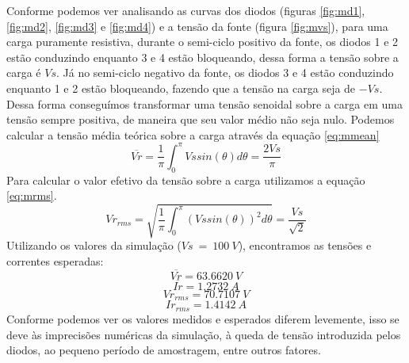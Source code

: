 \documentclass{report}
\begin{document}
Conforme podemos ver analisando as curvas dos diodos (figuras \ref{fig:md1}, \ref{fig:md2}, \ref{fig:md3} e \ref{fig:md4}) e a tensão da fonte (figura \ref{fig:mvs}), para uma carga puramente resistiva, durante o semi-ciclo positivo da fonte, os diodos 1 e 2 estão conduzindo enquanto 3 e 4 estão bloqueando, dessa forma a tensão sobre a carga é $Vs$. Já no semi-ciclo negativo da fonte, os diodos 3 e 4 estão conduzindo enquanto 1 e 2 estão bloqueando, fazendo que a tensão na carga seja de $-Vs$. Dessa forma conseguímos transformar uma tensão senoidal sobre a carga em uma tensão sempre positiva, de maneira que seu valor médio não seja nulo.
Podemos calcular a tensão média teórica sobre a carga através da equação \ref{eq:mmean}
\begin{equation}
	\overline{Vr} = \frac{1}{\pi} \int_{0}^{\pi}{Vs sin(\theta)d\theta} = \frac{2 Vs}{\pi}
	\label{eq:mmean}
\end{equation}
Para calcular o valor efetivo da tensão sobre a carga utilizamos a equação \ref{eq:mrms}.
\begin{equation}
	Vr_{rms} = \sqrt{\frac{1}{\pi} \int_{0}^{\pi}{(Vs sin(\theta))^2 d\theta}} = \frac{Vs}{\sqrt{2}}
	\label{eq:mrms}
\end{equation}
Utilizando os valores da simulação ($Vs\ =\ 100\ V$), encontramos as tensões e correntes esperadas:
\begin{equation}
\overline{Vr} = 63.6620\ V
\end{equation}
\begin{equation}
\overline{Ir} = 1.2732\ A
\end{equation}
\begin{equation}
Vr_{rms} =  70.7107\ V
\end{equation}
\begin{equation}
Ir_{rms} = 1.4142\ A
\end{equation}
Conforme podemos ver os valores medidos e esperados diferem levemente, isso se deve às imprecisões numéricas da simulação, à queda de tensão introduzida pelos diodos, ao pequeno período de amostragem, entre outros fatores.
\end{document}
